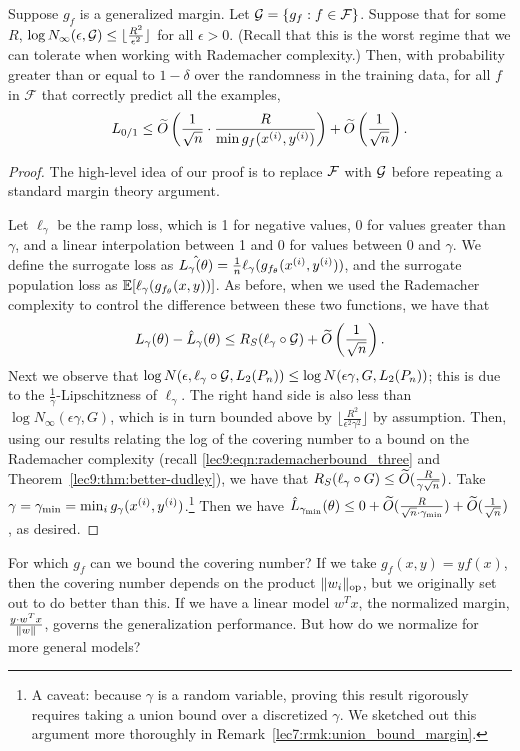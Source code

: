 \begin{lemma}
Suppose $g_f$ is a generalized margin. Let $\cG = \{g_f: f \in \mathcal{F}\}$. Suppose that for some $R$, $\log N_\infty(\epsilon, \cG) \leq \lfloor \frac{R^2}{\epsilon^2} \rfloor$ for all $\epsilon > 0$. (Recall that this is the worst regime that we can tolerate when working with Rademacher complexity.) Then, with probability greater than or equal to $1 - \delta$ over the randomness in the training data, for all $f$ in $\mathcal{F}$ that correctly predict all the examples,
\begin{equation}
L_{0/1} \leq \tilO \l (\frac{1}{\sqrt{n}} \cdot \frac{R}{\min g_f(x\sp{i}, y\sp{i})} \r ) + \tilO\l (\frac{1}{\sqrt{n}}\r ).
\end{equation}
\label{lec11:genmargin-lemma}
\end{lemma}

\begin{proof}
The high-level idea of our proof is to replace $\cF$ with $\cG$ before repeating a standard margin theory argument.

Let $\ell_\gamma$ be the ramp loss, which is 1 for negative values, 0 for values greater than $\gamma$, and a linear interpolation between 1 and 0 for values between 0 and $\gamma$. We define the surrogate loss as $\hat{L_\gamma(\theta)} = \frac{1}{n} \ell_\gamma(g_{f_\theta}(x\sp{i}, y\sp{i}))$, and the surrogate population loss as $\Exp[\ell_\gamma(g_{f_\theta}(x, y))]$. As before, when we used the Rademacher complexity to control the difference between these two functions, we have that
\begin{equation}
L_\gamma(\theta) - \hat{L}_\gamma(\theta) \leq R_S(\ell_\gamma \circ \cG) + \tilO\l (\frac{1}{\sqrt{n}}\r ).
\end{equation}
Next we observe that $\log N(\epsilon, \ell_\gamma \circ \cG, L_2(P_n)) \leq \log N(\epsilon\gamma, G, L_2(P_n))$; this is due to the $\frac{1}{\gamma}$-Lipschitzness of $\ell_\gamma$. The right hand side is also less than $\log N_\infty(\epsilon\gamma, G)$, which is in turn bounded above by $\lfloor \frac{R^2}{\epsilon^2 \gamma^2} \rfloor$ by assumption.
Then, using our results relating the log of the covering number to a bound on the Rademacher complexity (recall \ref{lec9:eqn:rademacherbound_three} and Theorem~\ref{lec9:thm:better-dudley}), we have that $R_S(\ell_\gamma \circ G) \leq \tilO(\frac{R}{\gamma \sqrt{n}})$.
Take $\gamma = \gamma_{\min} = \min_{i} g_\gamma(x\sp{i}, y\sp{i})$.\footnote{A caveat: because $\gamma$ is a random variable, proving this result rigorously requires taking a union bound over a discretized $\gamma$. We sketched out this argument more thoroughly in Remark~\ref{lec7:rmk:union_bound_margin}.} Then we have $\hat{L}_{\gamma_\text{min}} (\theta) \leq 0 + \tilO(\frac{R}{\sqrt{n} \cdot \gamma_\text{min}}) + \tilO(\frac{1}{\sqrt{n}})$, as desired.
\end{proof}
For which $g_f$ can we bound the covering number? If we take $g_f(x, y) = yf(x)$, then the covering number depends on the product $\norm{w_i}_{\text{op}}$, but we originally set out to do better than this. If we have a linear model $w^T x$, the normalized margin, $\frac{y \cdot w^T x}{\norm{w}}$, governs the generalization performance. But how do we normalize for more general models? 

